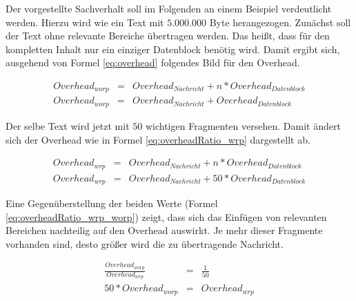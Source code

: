 Der vorgestellte Sachverhalt soll im Folgenden an einem Beispiel
verdeutlicht werden. Hierzu wird wie ein Text mit $5.000.000$ Byte herangezogen.
Zunächst soll der Text ohne relevante Bereiche übertragen werden. Das heißt,
dass für den kompletten Inhalt nur ein einziger Datenblock benötig wird. Damit
ergibt sich, ausgehend von Formel \ref{eq:overhead} folgendes Bild für den
Overhead.

\begin{eqnarray} 
	Overhead_{worp} & = & Overhead_{Nachricht} + n * Overhead_{Datenblock} \\
	Overhead_{worp} & = & Overhead_{Nachricht} + Overhead_{Datenblock}
	\label{eq:overheadRatio_worp}
\end{eqnarray}

Der selbe Text wird jetzt mit $50$ wichtigen Fragmenten versehen. Damit ändert
sich der Overhead wie in Formel \ref{eq:overheadRatio_wrp} dargestellt ab. 

\begin{eqnarray} 
	Overhead_{wrp} & = & Overhead_{Nachricht} + n * Overhead_{Datenblock} \\
	Overhead_{wrp} & = & Overhead_{Nachricht} + 50 * Overhead_{Datenblock}
	\label{eq:overheadRatio_wrp}
\end{eqnarray}

Eine Gegenüberstellung der beiden Werte (Formel \ref{eq:overheadRatio_wrp_worp})
zeigt, dass sich das Einfügen von relevanten Bereichen nachteilig auf den
Overhead auswirkt. Je mehr dieser Fragmente vorhanden sind, desto größer wird
die zu übertragende Nachricht.

\begin{eqnarray} 
	\frac{ Overhead_{worp} }{ Overhead_{wrp} } & = & \frac{1}{50} \\
	50 * Overhead_{worp} & = & Overhead_{wrp} 
	\label{eq:overheadRatio_wrp_worp}
\end{eqnarray}